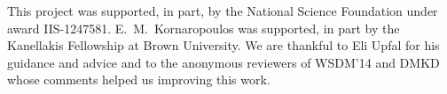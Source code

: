 \documentclass{svjour3}                     %
\begin{document}
\begin{acknowledgements}
This project was supported, in part, by the National Science Foundation under
award IIS-1247581. E.~M.~Kornaropoulos was supported, in part by the Kanellakis
Fellowship at Brown University. We are thankful to Eli Upfal for his guidance
and advice and to the anonymous reviewers of WSDM'14 and DMKD whose comments
helped us improving this work.
\end{acknowledgements}



\end{document}
